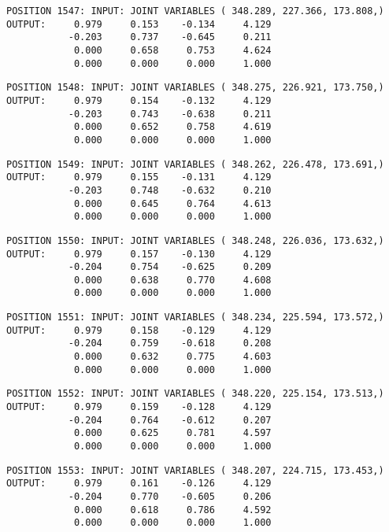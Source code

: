 \begin{verbatim}
POSITION 1547: INPUT: JOINT VARIABLES ( 348.289, 227.366, 173.808,)
OUTPUT:     0.979     0.153    -0.134     4.129
           -0.203     0.737    -0.645     0.211
            0.000     0.658     0.753     4.624
            0.000     0.000     0.000     1.000
\end{verbatim} \pagebreak[1]\begin{verbatim}
POSITION 1548: INPUT: JOINT VARIABLES ( 348.275, 226.921, 173.750,)
OUTPUT:     0.979     0.154    -0.132     4.129
           -0.203     0.743    -0.638     0.211
            0.000     0.652     0.758     4.619
            0.000     0.000     0.000     1.000
\end{verbatim} \pagebreak[1]\begin{verbatim}
POSITION 1549: INPUT: JOINT VARIABLES ( 348.262, 226.478, 173.691,)
OUTPUT:     0.979     0.155    -0.131     4.129
           -0.203     0.748    -0.632     0.210
            0.000     0.645     0.764     4.613
            0.000     0.000     0.000     1.000
\end{verbatim} \pagebreak[1]\begin{verbatim}
POSITION 1550: INPUT: JOINT VARIABLES ( 348.248, 226.036, 173.632,)
OUTPUT:     0.979     0.157    -0.130     4.129
           -0.204     0.754    -0.625     0.209
            0.000     0.638     0.770     4.608
            0.000     0.000     0.000     1.000
\end{verbatim} \pagebreak[1]\begin{verbatim}
POSITION 1551: INPUT: JOINT VARIABLES ( 348.234, 225.594, 173.572,)
OUTPUT:     0.979     0.158    -0.129     4.129
           -0.204     0.759    -0.618     0.208
            0.000     0.632     0.775     4.603
            0.000     0.000     0.000     1.000
\end{verbatim} \pagebreak[1]\begin{verbatim}
POSITION 1552: INPUT: JOINT VARIABLES ( 348.220, 225.154, 173.513,)
OUTPUT:     0.979     0.159    -0.128     4.129
           -0.204     0.764    -0.612     0.207
            0.000     0.625     0.781     4.597
            0.000     0.000     0.000     1.000
\end{verbatim} \pagebreak[1]\begin{verbatim}
POSITION 1553: INPUT: JOINT VARIABLES ( 348.207, 224.715, 173.453,)
OUTPUT:     0.979     0.161    -0.126     4.129
           -0.204     0.770    -0.605     0.206
            0.000     0.618     0.786     4.592
            0.000     0.000     0.000     1.000
\end{verbatim} \pagebreak[1]\begin{verbatim}

\end{verbatim}
